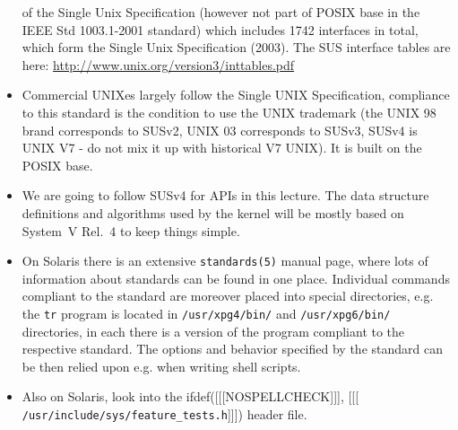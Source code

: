 \documentclass[article]{seminar}
\newcommand{\sltitle}[1]{{\centering\textbf{\Large #1}
    \vskip 2em plus 0pt minus 2em\par}} %
\begin{document}
\begin{itemize}
of the Single Unix Specification (however not part of POSIX base in the IEEE Std
1003.1-2001 standard) which includes 1742 interfaces in total, which form the Single Unix
Specification (2003). The SUS interface tables are here:
\url{http://www.unix.org/version3/inttables.pdf}
\item Commercial UNIXes largely follow the Single UNIX Specification, compliance
to this standard is the condition to use the UNIX trademark
(the UNIX 98 brand corresponds to SUSv2, UNIX 03 corresponds to SUSv3, SUSv4 is
UNIX V7 - do not mix it up with historical V7 UNIX). It is built on the POSIX
base.
\item We are going to follow SUSv4 for APIs in this lecture. The data structure
definitions and algorithms used by the kernel will be mostly based on
System~V Rel.~4 to keep things simple.
\item On Solaris there is an extensive \texttt{standards(5)} manual page, where
lots of information about standards can be found in one place.
Individual commands compliant to the standard are moreover placed
into special directories, e.g. the \texttt{tr} program is located in
\texttt{/usr/xpg4/bin/} and \texttt{/usr/xpg6/bin/} directories, in each there
is a version of the program compliant to the respective standard.
The options and behavior specified by the standard can be then relied upon e.g.
when writing shell scripts.
\item Also on Solaris, look into the
ifdef([[[NOSPELLCHECK]]], [[[
\texttt{/usr/inc{}lude/sys/fea\-ture\-\_tests.h}]]]) header file.
\end{itemize}


\end{document}
